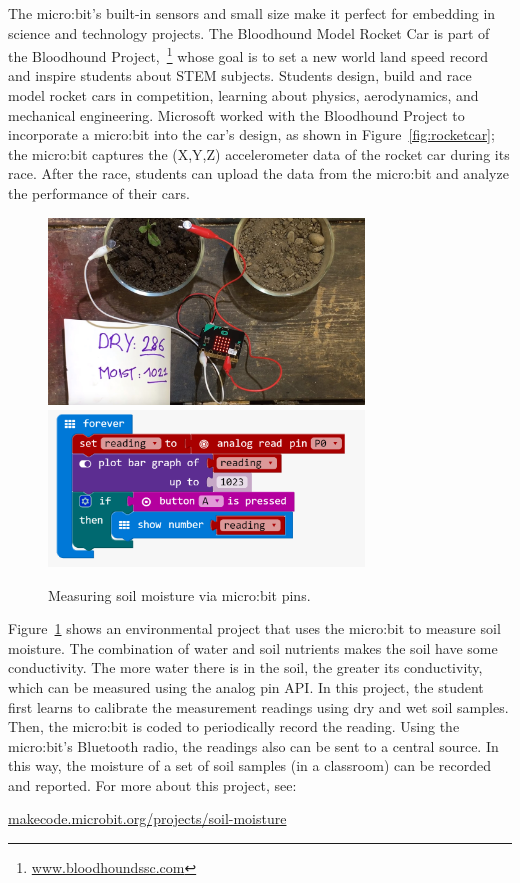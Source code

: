The micro:bit's built-in sensors and small size make it perfect for embedding
in science and technology projects.  The Bloodhound Model Rocket Car is 
part of the Bloodhound Project,~\footnote{\url{www.bloodhoundssc.com}} 
whose goal is to set a new world land speed
record and inspire students about STEM subjects. 
Students design, build and race model rocket cars in competition, learning about
physics, aerodynamics, and mechanical engineering. Microsoft worked with
the Bloodhound Project to incorporate a micro:bit into the car's design,
as shown in Figure~\ref{fig:rocketcar};
the micro:bit captures the (X,Y,Z) accelerometer data of the rocket car
during its race. After the race, students can upload the data from 
the micro:bit and analyze the performance of their cars. 

%


\begin{figure}[t]
    \includegraphics[width=3.3in]{images/moisture.jpg} 
    \includegraphics[width=3.3in]{images/moistureBlocks.png} 
    \caption{\label{fig:moisture}Measuring soil moisture via micro:bit pins.}
\end{figure}

Figure~\ref{fig:moisture} shows an environmental project that uses the 
micro:bit to measure soil moisture. The combination of water 
and soil nutrients makes the soil have some conductivity. The more water there is
in the soil, the greater its conductivity, which can be measured using
the analog pin API. In this project, the student
first learns to calibrate the measurement readings using dry and wet 
soil samples.  Then, the micro:bit is coded to periodically record the
reading. Using the micro:bit's Bluetooth radio, the readings also can
be sent to a central source.  In this way, the moisture of a set of soil
samples (in a classroom) can be recorded and reported. For more about this
project, see:
\begin{center}    
    \small{\url{makecode.microbit.org/projects/soil-moisture}}
\end{center} 

